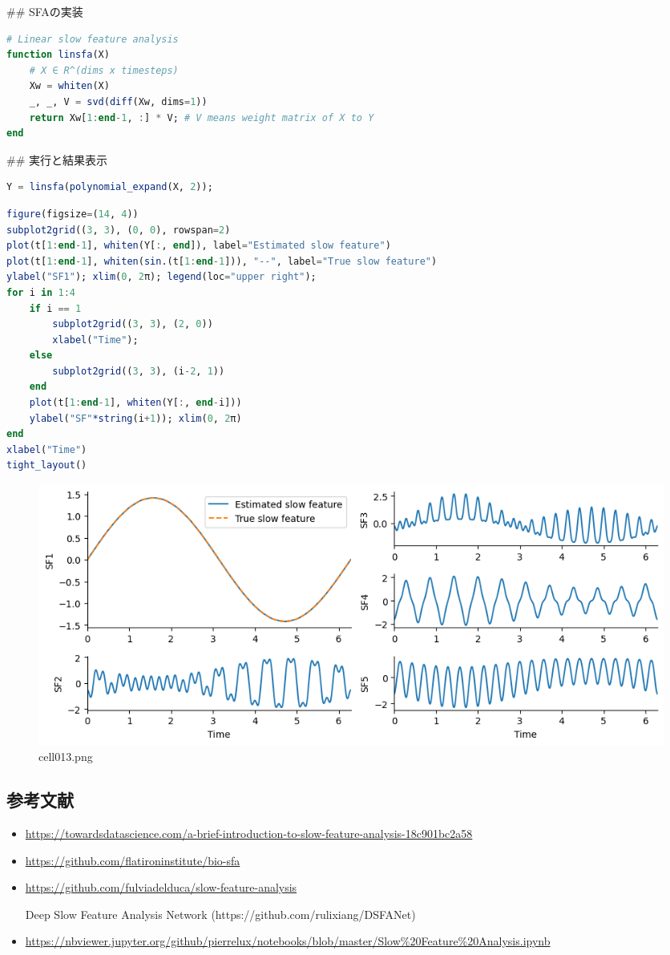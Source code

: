 ## SFAの実装
\begin{lstlisting}[language=julia]
# Linear slow feature analysis
function linsfa(X)
    # X ∈ R^(dims x timesteps)
    Xw = whiten(X)
    _, _, V = svd(diff(Xw, dims=1))
    return Xw[1:end-1, :] * V; # V means weight matrix of X to Y
end
\end{lstlisting}
## 実行と結果表示
\begin{lstlisting}[language=julia]
Y = linsfa(polynomial_expand(X, 2));
\end{lstlisting}
\begin{lstlisting}[language=julia]
figure(figsize=(14, 4))
subplot2grid((3, 3), (0, 0), rowspan=2)
plot(t[1:end-1], whiten(Y[:, end]), label="Estimated slow feature")
plot(t[1:end-1], whiten(sin.(t[1:end-1])), "--", label="True slow feature")
ylabel("SF1"); xlim(0, 2π); legend(loc="upper right");
for i in 1:4
    if i == 1
        subplot2grid((3, 3), (2, 0))
        xlabel("Time");
    else
        subplot2grid((3, 3), (i-2, 1))
    end
    plot(t[1:end-1], whiten(Y[:, end-i]))
    ylabel("SF"*string(i+1)); xlim(0, 2π)
end
xlabel("Time")
tight_layout()
\end{lstlisting}
\begin{figure}[ht]
	\centering
	\includegraphics[scale=0.8, max width=\linewidth]{./fig/local-learning-rule/slow-feature-analysis/cell013.png}
	\caption{cell013.png}
	\label{cell013.png}
\end{figure}
\subsection{参考文献}
\begin{itemize}
\item \url{https://towardsdatascience.com/a-brief-introduction-to-slow-feature-analysis-18c901bc2a58}
\item \url{https://github.com/flatironinstitute/bio-sfa}
\item \url{https://github.com/fulviadelduca/slow-feature-analysis}
\item [Deep Slow Feature Analysis Network](https://github.com/rulixiang/DSFANet)
\item \url{https://nbviewer.jupyter.org/github/pierrelux/notebooks/blob/master/Slow%20Feature%20Analysis.ipynb}
\end{itemize}
